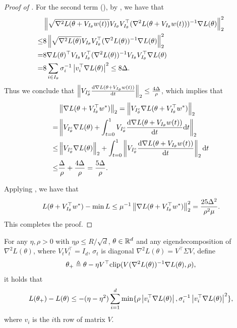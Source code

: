 \begin{proof}[Proof of ]
For the second term (), by , we have that 
\begin{align}
&\left\|\sqrt{\nabla^2 L(\theta+ V_{I_\theta} w(t))}V_{I_\theta}V_{I_\theta}^\top(\nabla^2 L(\theta+ V_{I_\theta} w(t)))^{-1} \nabla L(\theta) \right\|_2^2 \\
\le &8 \left\|\sqrt{\nabla^2 L(\theta)}V_{I_\theta}V_{I_\theta}^\top(\nabla^2 L(\theta))^{-1} \nabla L(\theta) \right\|_2^2\\
= &8 \nabla L(\theta) ^\top V_{I_\theta}V_{I_\theta}^\top(\nabla^2 L(\theta))^{-1} V_{I_\theta}V_{I_\theta}^\top\nabla L(\theta) \\
= & 8\sum_{i\in I_\theta}  \sigma_i^{-1}\left| v_i^\top \nabla L(\theta) \right|^2 \le 8\Delta.
\end{align}
Thus we conclude that $\left\|V_{I_\theta^c}\frac{\mathrm{d} \nabla L(\theta+ V_{I_\theta} w(t))}{\mathrm{d} t}\right\|_2\le  \frac{4\Delta}{\rho}$, which implies that 
\begin{align}
&\left\|\nabla L(\theta+V_{I_\theta}^\top w^*)\right\|_2 = \left\|V_{I_\theta^c}\nabla L(\theta+V_{I_\theta}^\top w^*)\right\|_2\\
 = &\left\|V_{I_\theta^c}\nabla L(\theta)+\int_{t=0}^1 V_{I_\theta^c}\frac{\mathrm{d} \nabla L(\theta+ V_{I_\theta} w(t))}{\mathrm{d} t}\mathrm{d} t\right\|_2\\
 \le & \left\|V_{I_\theta^c}\nabla L(\theta)\right\|_2 +\int_{t=0}^1\left\| V_{I_\theta^c}\frac{\mathrm{d} \nabla L(\theta+ V_{I_\theta} w(t))}{\mathrm{d} t}\right\|_2\mathrm{d} t \\
 \le & \frac{\Delta}{\rho} + \frac{4\Delta}{\rho} = \frac{5\Delta}{\rho}. 	
\end{align}

Applying , we have that 
\begin{align}
	L(\theta+V_{I_\theta}^\top w^*) -\min L\le \mu^{-1} \left\|\nabla L(\theta+V_{I_\theta}^\top w^*)\right\|_2^2 = \frac{25\Delta^2}{\rho^2\mu}.
\end{align}
This completes the proof.
\end{proof}


\begin{lemma}\label{lem:descent_lemma}
	For any $\eta,\rho>0$ with $\eta\rho\le R/\sqrt{d}$, $\theta\in\mathbb{R}^d$ and any eigendecomposition of 
$\nabla^2 L(\theta)$, where $V_tV_t^\top=I_d$, $\sigma_t$ is diagonal $\nabla^2 L(\theta) = V^\top \Sigma V$, define 
	\begin{align}
	\theta_+ \triangleq 	 \theta - \eta V^\top\textup{clip}(V(\nabla^2L(\theta))^{-1}\nabla L(\theta),\rho),
	\end{align}
it holds that 
	\begin{align}
			L(\theta_+) - L(\theta)\le -(\eta-\eta^2)\sum_{i=1}^d \min\{ \rho \left| v_i^\top \nabla L(\theta) \right|, \sigma_i^{-1}\left| v_i^\top \nabla L(\theta) \right|^2\},
	\end{align}
where $v_i$ is the $i$th row of matrix $V$.
\end{lemma}


